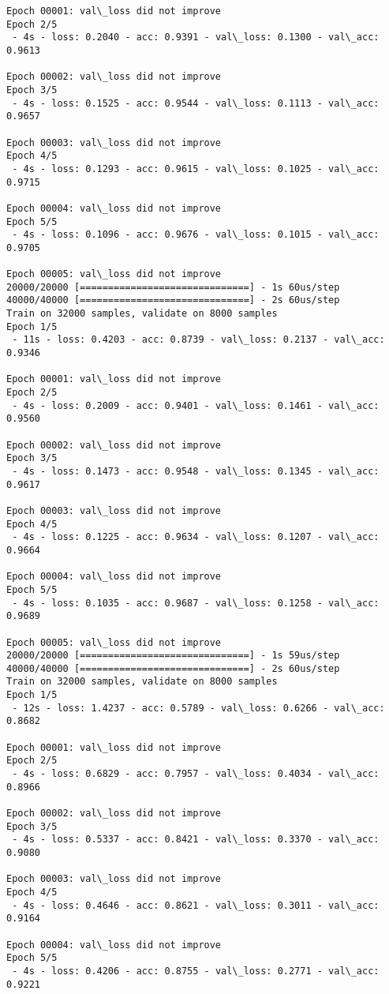 \documentclass[11pt]{article}
\begin{document}
\begin{Verbatim}[commandchars=\\\{\}]
Epoch 00001: val\_loss did not improve
Epoch 2/5
 - 4s - loss: 0.2040 - acc: 0.9391 - val\_loss: 0.1300 - val\_acc: 0.9613

Epoch 00002: val\_loss did not improve
Epoch 3/5
 - 4s - loss: 0.1525 - acc: 0.9544 - val\_loss: 0.1113 - val\_acc: 0.9657

Epoch 00003: val\_loss did not improve
Epoch 4/5
 - 4s - loss: 0.1293 - acc: 0.9615 - val\_loss: 0.1025 - val\_acc: 0.9715

Epoch 00004: val\_loss did not improve
Epoch 5/5
 - 4s - loss: 0.1096 - acc: 0.9676 - val\_loss: 0.1015 - val\_acc: 0.9705

Epoch 00005: val\_loss did not improve
20000/20000 [==============================] - 1s 60us/step
40000/40000 [==============================] - 2s 60us/step
Train on 32000 samples, validate on 8000 samples
Epoch 1/5
 - 11s - loss: 0.4203 - acc: 0.8739 - val\_loss: 0.2137 - val\_acc: 0.9346

Epoch 00001: val\_loss did not improve
Epoch 2/5
 - 4s - loss: 0.2009 - acc: 0.9401 - val\_loss: 0.1461 - val\_acc: 0.9560

Epoch 00002: val\_loss did not improve
Epoch 3/5
 - 4s - loss: 0.1473 - acc: 0.9548 - val\_loss: 0.1345 - val\_acc: 0.9617

Epoch 00003: val\_loss did not improve
Epoch 4/5
 - 4s - loss: 0.1225 - acc: 0.9634 - val\_loss: 0.1207 - val\_acc: 0.9664

Epoch 00004: val\_loss did not improve
Epoch 5/5
 - 4s - loss: 0.1035 - acc: 0.9687 - val\_loss: 0.1258 - val\_acc: 0.9689

Epoch 00005: val\_loss did not improve
20000/20000 [==============================] - 1s 59us/step
40000/40000 [==============================] - 2s 60us/step
Train on 32000 samples, validate on 8000 samples
Epoch 1/5
 - 12s - loss: 1.4237 - acc: 0.5789 - val\_loss: 0.6266 - val\_acc: 0.8682

Epoch 00001: val\_loss did not improve
Epoch 2/5
 - 4s - loss: 0.6829 - acc: 0.7957 - val\_loss: 0.4034 - val\_acc: 0.8966

Epoch 00002: val\_loss did not improve
Epoch 3/5
 - 4s - loss: 0.5337 - acc: 0.8421 - val\_loss: 0.3370 - val\_acc: 0.9080

Epoch 00003: val\_loss did not improve
Epoch 4/5
 - 4s - loss: 0.4646 - acc: 0.8621 - val\_loss: 0.3011 - val\_acc: 0.9164

Epoch 00004: val\_loss did not improve
Epoch 5/5
 - 4s - loss: 0.4206 - acc: 0.8755 - val\_loss: 0.2771 - val\_acc: 0.9221


\end{Verbatim}
\end{document}
